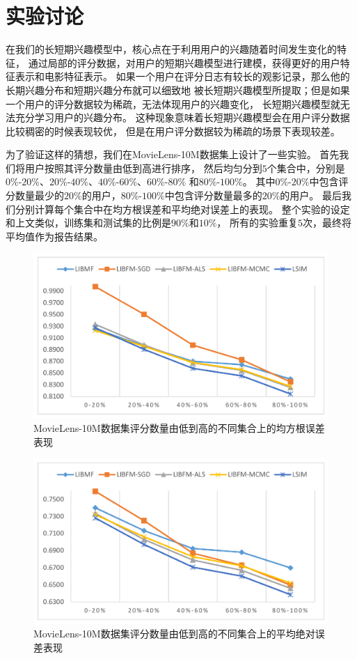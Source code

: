 \section{实验讨论}
在我们的长短期兴趣模型中，核心点在于利用用户的兴趣随着时间发生变化的特征，
通过局部的评分数据，对用户的短期兴趣模型进行建模，获得更好的用户特征表示和电影特征表示。
如果一个用户在评分日志有较长的观影记录，那么他的长期兴趣分布和短期兴趣分布就可以细致地
被长短期兴趣模型所提取；但是如果一个用户的评分数据较为稀疏，无法体现用户的兴趣变化，
长短期兴趣模型就无法充分学习用户的兴趣分布。
这种现象意味着长短期兴趣模型会在用户评分数据比较稠密的时候表现较优，
但是在用户评分数据较为稀疏的场景下表现较差。

为了验证这样的猜想，我们在MovieLens-10M数据集上设计了一些实验。
首先我们将用户按照其评分数量由低到高进行排序，
然后均匀分到$5$个集合中，分别是$0\%$-$20\%$、$20\%$-$40\%$、$40\%$-$60\%$、$60\%$-$80\%$
和$80\%$-$100\%$。
其中$0\%$-$20\%$中包含评分数量最少的$20\%$的用户，$80\%$-$100\%$中包含评分数量最多的$20\%$的用户。
最后我们分别计算每个集合中在均方根误差和平均绝对误差上的表现。
整个实验的设定和上文类似，训练集和测试集的比例是$90\%$和$10\%$，
所有的实验重复$5$次，最终将平均值作为报告结果。

\begin{figure}[htbp]
    \centering
    \includegraphics[scale=0.5]{images/rank_rmse.pdf}
    \caption{MovieLens-10M数据集评分数量由低到高的不同集合上的均方根误差表现}
    \label{fig:rank_rsme}
\end{figure}

\begin{figure}[htbp]
    \centering
    \includegraphics[scale=0.5]{images/rank_mae.pdf}
    \caption{MovieLens-10M数据集评分数量由低到高的不同集合上的平均绝对误差表现}
    \label{fig:rank_mae}
\end{figure}

